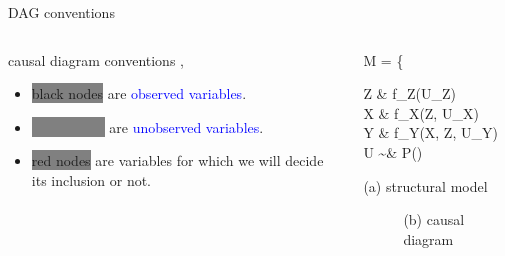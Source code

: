 %
%
\begin{frame}
	{DAG conventions}
	\begin{columns}
		\begin{column}{0.5\textwidth}
			causal diagram conventions \cite{Cinelli_et_al_2021},
			\begin{itemize}
				\item \colorbox{gray}{black nodes} are \textcolor{blue}{observed variables}.
				\item \colorbox{grey}{\textcolor{gray}{white nodes}} are \textcolor{blue}{unobserved variables}.
				\item \colorbox{gray}{\alert{red nodes}} are variables for which we will decide its inclusion or not.
			\end{itemize}
		\end{column}
		\begin{column}{0.5\textwidth}  
			\begin{equ}
				M = \left\{ \begin{aligned} 
					Z \leftarrow & \; f_{Z}(U_{Z}) \\
					X \leftarrow & \; f_{X}(Z, U_{X}) \\
					Y \leftarrow & \; f_{Y}(X, Z, U_{Y}) \\
					U \sim & \; P()
				\end{aligned} \right
				\caption*{(a) structural model}
			\end{equ}
			\begin{figure}
				\caption*{(b) causal diagram }
			\end{figure}
		\end{column}
	\end{columns}
\end{frame}
